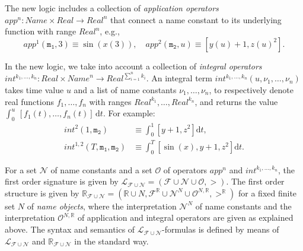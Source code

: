 The new logic 
includes
a collection of \emph{application operators} $\mathit{app}^n : \mathit{Name} \times \mathit{Real} \to \mathit{Real}^n$
that connect a name constant to its underlying function with range $\mathit{Real}^n$, e.g.,
\[
\mathit{app}^1(\mathtt{m_1}, 3) \equiv \sin(x(3)),
\quad
\mathit{app}^2(\mathtt{m_2}, u) \equiv [y(u) + 1,z(u)^2].
\]
 

In the new logic,  we take into account
a collection of \emph{integral operators} 
$\mathit{int}^{k_1,\ldots,k_n} :  \mathit{Real} \times \mathit{Name}^n  \to \mathit{Real}^{\sum_{i=1}^n k_i}$.
An integral term
$\mathit{int}^{k_1,\ldots,k_n}(u,\nu_1,\ldots,\nu_n)$
takes time value $u$
and a list of name constants $\nu_1,\ldots,\nu_n$,
to respectively denote real functions $f_1,\ldots,f_n$ with ranges $\mathit{Real}^{k_1},\ldots,\mathit{Real}^{k_n}$,
and returns the value $\int_0^u \, [f_1(t),\ldots,f_n(t)] \,\mathrm{d}t$.  
For example:
\begin{align*}
\mathit{int}^{2}(1, \mathtt{m_2}) 
&\equiv
\int_0^1
[y + 1, z^2]
\mathrm{d}t,
\\
\mathit{int}^{1,2}(T,\mathtt{m_1},\mathtt{m_2}) 
&\equiv
\int_0^T
[\sin(x),y + 1,z^2]
\mathrm{d}t.
\end{align*}









\begin{definition}
For a  set $\mathcal{N}$ of name constants
and a set  $\mathcal{O}$ of operators  $\mathit{app}^n$ and  $\mathit{int}^{k_1,\ldots,k_n}$,
the first order signature is given by 
$\mathcal{L}_{\mathcal{F}\cup\mathcal{N}} = (\mathcal{F} \cup \mathcal{N} \cup \mathcal{O}, >)$.
%
The first order structure is given by
$\mathbb{R}_{\mathcal{F}\cup\mathcal{N}} 
= (\mathbb{R} \cup N, \mathcal{F}^\mathbb{R} \cup \mathcal{N}^N \cup \mathcal{O}^{N,\mathbb{R}}, >^\mathbb{R})$
for a fixed finite set $N$ of \emph{name objects},
where the interpretation $\mathcal{N}^N$ of name constants and 
the interpretation $\mathcal{O}^{N,\mathbb{R}}$ of application and integral operators 
are given as explained above.
%
The syntax and semantics of $\mathcal{L}_{\mathcal{F}\cup\mathcal{N}}$-formulas 
is defined by means of $\mathcal{L}_{\mathcal{F}\cup\mathcal{N}}$ and $\mathbb{R}_{\mathcal{F}\cup\mathcal{N}}$
in the standard way.
\end{definition}




